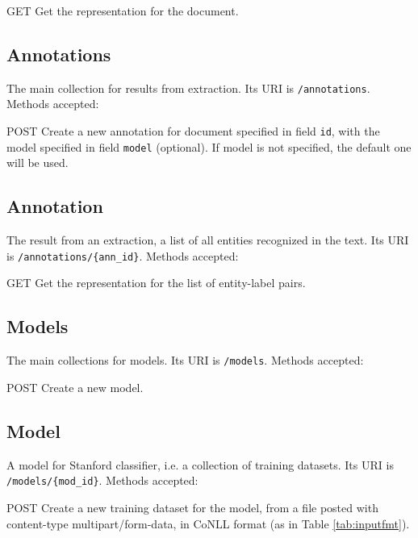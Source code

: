 \documentclass[a4paper,11pt]{report}
\begin{document}
\begin{description}
\item{GET} Get the representation for the document.
\end{description}

\subsection*{Annotations}
The main collection for results from extraction. Its URI is \texttt{/annotations}.
Methods accepted:
\begin{description}
\item{POST} Create a new annotation for document specified in field \texttt{id}, with the model specified in field \texttt{model} (optional). If model is not specified, the default one will be used.
\end{description}

\subsection*{Annotation}
The result from an extraction, a list of all entities recognized in the text. Its URI is \texttt{/annotations/\{ann\_id\}}. Methods accepted:
\begin{description}
\item{GET} Get the representation for the list of entity-label pairs.
\end{description}

\subsection*{Models}
The main collections for models. Its URI is \texttt{/models}. Methods accepted:
\begin{description}
\item{POST} Create a new model.
\end{description}

\subsection*{Model}
A model for Stanford classifier, i.e. a collection of training datasets. Its URI is \texttt{/models/\{mod\_id\}}. Methods accepted:
\begin{description}
\item{POST} Create a new training dataset for the model, from a file posted with content-type multipart/form-data, in CoNLL format (as in Table \ref{tab:inputfmt}). 
\end{description}
\end{document}
